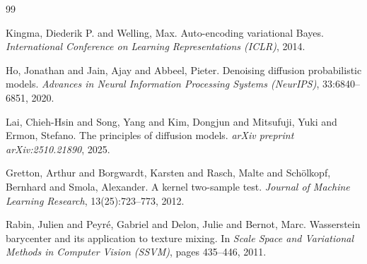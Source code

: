 \documentclass[UTF8,a4paper,12pt]{ctexart}
\begin{document}
\clearpage
\begin{thebibliography}{99}

Kingma, Diederik P. and Welling, Max.
\newblock Auto-encoding variational Bayes.
\newblock \emph{International Conference on Learning Representations (ICLR)}, 2014.

Ho, Jonathan and Jain, Ajay and Abbeel, Pieter.
\newblock Denoising diffusion probabilistic models.
\newblock \emph{Advances in Neural Information Processing Systems (NeurIPS)}, 33:6840--6851, 2020.

Lai, Chieh-Hsin and Song, Yang and Kim, Dongjun and Mitsufuji, Yuki and Ermon, Stefano.
\newblock The principles of diffusion models.
\newblock \emph{arXiv preprint arXiv:2510.21890}, 2025.

Gretton, Arthur and Borgwardt, Karsten and Rasch, Malte and Sch{\"o}lkopf, Bernhard and Smola, Alexander.
\newblock A kernel two-sample test.
\newblock \emph{Journal of Machine Learning Research}, 13(25):723--773, 2012.

Rabin, Julien and Peyr{\'e}, Gabriel and Delon, Julie and Bernot, Marc.
\newblock Wasserstein barycenter and its application to texture mixing.
\newblock In \emph{Scale Space and Variational Methods in Computer Vision (SSVM)}, pages 435--446, 2011.

\end{thebibliography}
\end{document}
